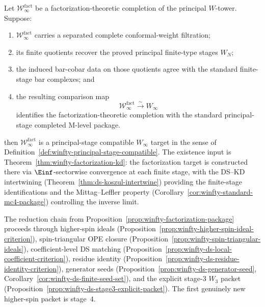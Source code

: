 \begin{proposition}
\label{prop:winfty-factorization-package}
Let $\mathcal{W}^{\mathrm{fact}}_\infty$ be a
factorization-theoretic completion of the principal $W$-tower. Suppose:
\begin{enumerate}
\item $\mathcal{W}^{\mathrm{fact}}_\infty$ carries a separated complete
 conformal-weight filtration;
\item its finite quotients recover the proved principal finite-type
 stages $W_N$;
\item the induced bar-cobar data on those quotients agree with the
 standard finite-stage bar complexes; and
\item the resulting comparison map
 \[
 \mathcal{W}^{\mathrm{fact}}_\infty \xrightarrow{\sim} W_\infty
 \]
 identifies the factorization-theoretic completion with the standard
 principal-stage completed M-level package.
\end{enumerate}
then $\mathcal{W}^{\mathrm{fact}}_\infty$ is a principal-stage
compatible $W_\infty$ target in the sense of
Definition~\ref{def:winfty-principal-stage-compatible}. The existence
input is Theorem~\ref{thm:winfty-factorization-kd}: the factorization
target is constructed there via $\Einf$-sectorwise convergence at each
finite stage, with the DS--KD intertwining
(Theorem~\ref{thm:ds-koszul-intertwine}) providing the
finite-stage identifications and the Mittag--Leffler property
(Corollary~\ref{cor:winfty-standard-mc4-package}) controlling
the inverse limit.
\end{proposition}

\begin{remark}
\label{rem:winfty-factorization-route}
The reduction chain from
Proposition~\ref{prop:winfty-factorization-package} proceeds through
higher-spin ideals
(Proposition~\ref{prop:winfty-higher-spin-ideal-criterion}),
spin-triangular OPE closure
(Proposition~\ref{prop:winfty-spin-triangular-ideals}),
coefficient-level DS matching
(Proposition~\ref{prop:winfty-ds-local-coefficient-criterion}),
residue identity
(Proposition~\ref{prop:winfty-ds-residue-identity-criterion}),
generator seeds
(Proposition~\ref{prop:winfty-ds-generator-seed},
Corollary~\ref{cor:winfty-ds-finite-seed-set}),
and the explicit stage-$3$ $W_3$ packet
(Proposition~\ref{prop:winfty-ds-stage3-explicit-packet}).
The first genuinely new higher-spin packet is stage~$4$.
\end{remark}

